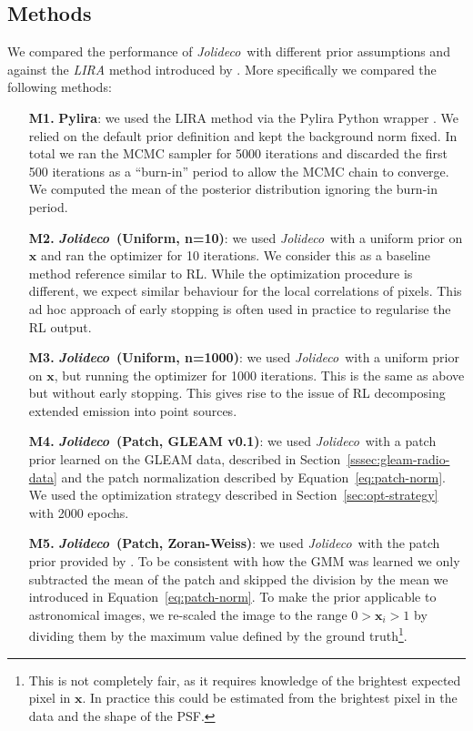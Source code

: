 \documentclass[twocolumn, linenumbers]{aastex631}
\newcommand{\jolideco}{\textit{Jolideco}~}
\begin{document}
    \subsection{Methods}
    \label{subsec:methods}
    We compared the performance of \jolideco with different prior assumptions and against the \textit{LIRA} method introduced by \cite{Esch2004}. More specifically we compared the following methods:

    \begin{enumerate}

        \item[\bf M1.] \textbf{Pylira}: we used the LIRA method \citep{Esch2004} via the Pylira Python wrapper \citep{Donath2022}. We relied on the default prior definition and kept the background norm fixed. In total we ran the MCMC sampler for 5000 iterations and discarded the first 500 iterations as a \enquote{burn-in} period to allow the MCMC chain to converge. We computed the mean of the posterior distribution ignoring the burn-in period.
        
        \item[\bf M2.] \textbf{\jolideco (Uniform, n=10)}: we used \jolideco with a uniform prior on $\mathbf{x}$ and ran the optimizer for 10 iterations. We consider this as a baseline method reference similar to RL. While the optimization procedure is different, we expect similar behaviour for the local correlations of pixels. This ad hoc approach of early stopping is often used in practice to regularise the RL output.
        
        \item[\bf M3.] \textbf{\jolideco (Uniform, n=1000)}:  we used \jolideco with a uniform prior on $\mathbf{x}$, but running the optimizer for 1000 iterations. This is the same as above but without early stopping. This gives rise to the issue of RL decomposing extended emission into point sources.
        
        \item[\bf M4.] \textbf{\jolideco (Patch, GLEAM v0.1)}: we used \jolideco with a patch prior learned on the GLEAM data, described in Section~\ref{sssec:gleam-radio-data} and the patch normalization described by Equation~\ref{eq:patch-norm}. We used the optimization strategy described in Section~\ref{sec:opt-strategy} with 2000 epochs.
        
        \item[\bf M5.] \textbf{\jolideco (Patch, Zoran-Weiss)}: we used \jolideco with the patch prior provided by \cite{Zoran2011}. To be consistent with how the GMM was learned we only subtracted the mean of the patch and skipped the division by the mean we introduced in Equation~\ref{eq:patch-norm}. To make the prior applicable to astronomical images, we re-scaled the image to the range $0 > \mathbf{x}_i > 1$ by dividing them by the maximum value defined by the ground truth\footnote{This is not completely fair, as it requires knowledge of the brightest expected pixel in $\mathbf{x}$. In practice this could be estimated from the brightest pixel in the data and the shape of the PSF.}.
    \end{enumerate}
\end{document}
